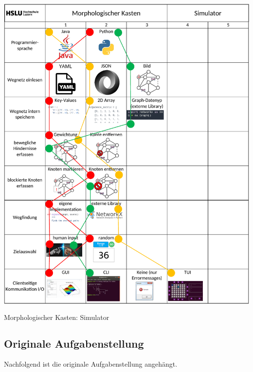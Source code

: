 \newpage
\begin{table}[H]
\centering
\includegraphics[width=\textwidth]{assets/MK_Simulator.pdf}
\caption{Morphologischer Kasten: Simulator}
\label{table:MK-Simulator}
\end{table}
\newpage

\subsection{Originale Aufgabenstellung}\label{aufgabenstellung}

Nachfolgend ist die originale Aufgabenstellung angehängt.


